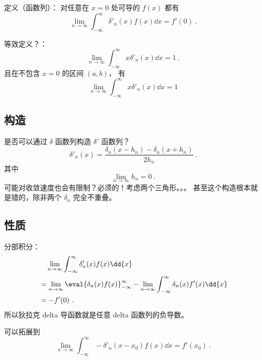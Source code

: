 
\begin{issues}
\issueDraft
\end{issues}


定义（函数列）： 对任意在 $x=0$ 处可导的 $f(x)$ 都有
\begin{equation}
\lim_{n\to\infty}\int_{-\infty}^\infty \delta'_n(x) f(x) \dd{x} = f'(0)~.
\end{equation}

等效定义？：
\begin{equation}
\lim_{n\to\infty}\int_{-\infty}^\infty x\delta'_n(x) \dd{x} = 1~.
\end{equation}
且在不包含 $x=0$ 的区间 $(a,b)$， 有
\begin{equation}
\lim_{n\to\infty}\int_{-\infty}^\infty x\delta'_n(x) \dd{x} = 1
\end{equation}


\subsection{构造}
是否可以通过 $\delta$ 函数列构造 $\delta'$ 函数列？
\begin{equation}
\delta'_n(x) = \frac{\delta_n(x-h_n) - \delta_n(x+h_n)}{2h_n}~.
\end{equation}
其中
\begin{equation}
\lim_{n\to\infty} h_n = 0~.
\end{equation}
可能对收敛速度也会有限制？必须的！考虑两个三角形。。。 甚至这个构造根本就是错的，除非两个 $\delta_n$ 完全不重叠。

\subsection{性质}
分部积分：
\begin{equation}
\begin{aligned}
&\quad \lim_{n\to\infty}\int_{-\infty}^\infty \delta'_n(x) f(x) \dd{x}\\
&= \lim_{n\to\infty}\eval{\delta_n(x) f(x)}_{-\infty}^\infty - \lim_{n\to\infty}\int_{-\infty}^\infty \delta_n(x) f'(x) \dd{x}\\
&= - f'(0)~.
\end{aligned}
\end{equation}
所以狄拉克 delta 导函数就是任意 delta 函数列的负导数。

可以拓展到
\begin{equation}
\lim_{n\to\infty}\int_{-\infty}^\infty -\delta'_n(x-x_0) f(x) \dd{x} = f'(x_0)~.
\end{equation}

